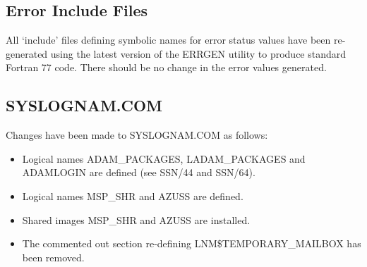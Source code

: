 \subsection{Error Include Files}
All `include' files defining symbolic names for error status values have been 
re-generated using the latest version of the ERRGEN utility to produce standard 
Fortran 77 code.
There should be no change in the error values generated.

\subsection{SYSLOGNAM.COM}
\label{syslog}
Changes have been made to SYSLOGNAM.COM as follows:
\begin{itemize}
\item Logical names ADAM\_PACKAGES, LADAM\_PACKAGES and ADAMLOGIN are defined
(see SSN/44 and SSN/64).
\item Logical names MSP\_SHR and AZUSS are defined.
\item Shared images MSP\_SHR and AZUSS are installed.
\item The commented out section re-defining LNM\$TEMPORARY\_MAILBOX has been
removed.
\end{itemize}

